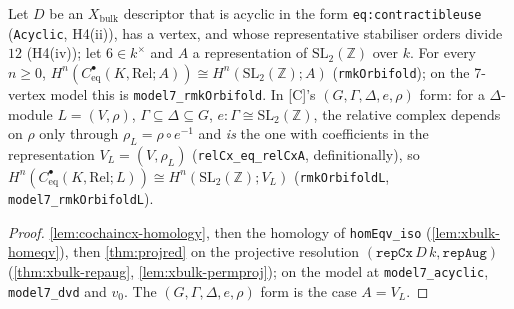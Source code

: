 \begin{theorem}\label{thm:model7-rmkorbifold}
  \leanok
  Let $D$ be an $X_{\mathrm{bulk}}$ descriptor that is acyclic in the form \texttt{eq:contractibleuse} (\texttt{Acyclic}, H4(ii)),
  has a vertex, and whose representative stabiliser orders divide $12$ (H4(iv)); let $6\in k^\times$ and $A$ a representation of
  $\mathrm{SL}_2(\mathbb Z)$ over $k$. For every $n\ge0$, $H^n(C^\bullet_{\mathrm{eq}}(K,\mathrm{Rel};A))\cong
  H^n(\mathrm{SL}_2(\mathbb Z);A)$ (\texttt{rmkOrbifold}); on the 7-vertex model this is \texttt{model7\_rmkOrbifold}. In [C]'s
  $(G,\Gamma,\Delta,e,\rho)$ form: for a $\Delta$-module $L=(V,\rho)$, $\Gamma\subseteq\Delta\subseteq G$, $e:\Gamma\cong\mathrm{SL}_2(\mathbb Z)$,
  the relative complex depends on $\rho$ only through $\rho_L=\rho\circ e^{-1}$ and \emph{is} the one with coefficients in the
  representation $V_L=(V,\rho_L)$ (\texttt{relCx\_eq\_relCxA}, definitionally), so
  $H^n(C^\bullet_{\mathrm{eq}}(K,\mathrm{Rel};L))\cong H^n(\mathrm{SL}_2(\mathbb Z);V_L)$ (\texttt{rmkOrbifoldL},
  \texttt{model7\_rmkOrbifoldL}).
\end{theorem}
\begin{proof}
  \leanok
  \ref{lem:cochaincx-homology}, then the homology of \texttt{homEqv\_iso} (\ref{lem:xbulk-homeqv}), then
  \ref{thm:projred} on the projective resolution $(\mathtt{repCx}\,D\,k,\mathtt{repAug})$ (\ref{thm:xbulk-repaug},
  \ref{lem:xbulk-permproj}); on the model at \texttt{model7\_acyclic}, \texttt{model7\_dvd} and $v_0$. The $(G,\Gamma,\Delta,e,\rho)$
  form is the case $A=V_L$.
\end{proof}

